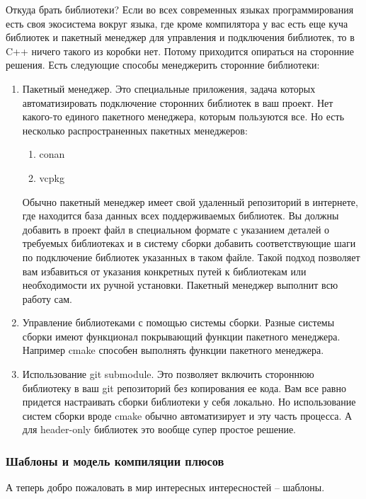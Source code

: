Откуда брать библиотеки?
Если во всех современных языках программирования есть своя экосистема вокруг языка, где кроме компилятора у вас есть еще куча библиотек и пакетный менеджер для управления и подключения библиотек, то в C++ ничего такого из коробки нет.
Потому приходится опираться на сторонние решения.
Есть следующие способы менеджерить сторонние библиотеки:
\begin{enumerate}
\item Пакетный менеджер.
Это специальные приложения, задача которых автоматизировать подключение сторонних библиотек в ваш проект.
Нет какого-то единого пакетного менеджера, которым пользуются все.
Но есть несколько распространенных пакетных менеджеров:
\begin{enumerate}
\item conan

\item vcpkg
\end{enumerate}
Обычно пакетный менеджер имеет свой удаленный репозиторий в интернете, где находится база данных всех поддерживаемых библиотек.
Вы должны добавить в проект файл в специальном формате с указанием деталей о требуемых библиотеках и в систему сборки добавить соответствующие шаги по подключение библиотек указанных в таком файле.
Такой подход позволяет вам избавиться от указания конкретных путей к библиотекам или необходимости их ручной установки.
Пакетный менеджер выполнит всю работу сам.

\item Управление библиотеками с помощью системы сборки.
Разные системы сборки имеют функционал покрывающий функции пакетного менеджера.
Например cmake способен выполнять функции пакетного менеджера.

\item Использование git submodule.
Это позволяет включить стороннюю библиотеку в ваш git репозиторий без копирования ее кода.
Вам все равно придется настраивать сборки библиотеки у себя локально.
Но использование систем сборки вроде cmake обычно автоматизирует и эту часть процесса.
А для header-only библиотек это вообще супер простое решение.
\end{enumerate}


\subsubsection{Шаблоны и модель компиляции плюсов}

А теперь добро пожаловать в мир интересных интересностей -- шаблоны.


